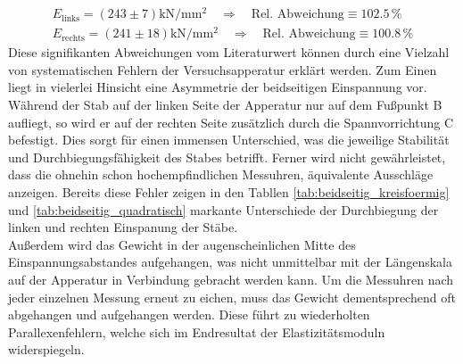 \begin{gather}
\label{eqn:schlechte_Werte_k}
    E_\text{links} =   \left( 243    \pm 7\right)\unit{\kilo \newton \per \milli \meter \squared}\quad \Rightarrow \quad \text{Rel. Abweichung} \equiv 102.5\,\unit{\percent}\\
    E_\text{rechts} =  \left( 241    \pm 18\right)\unit{\kilo \newton \per \milli \meter \squared}\quad \Rightarrow \quad \text{Rel. Abweichung} \equiv 100.8\,\unit{\percent}
\end{gather}
\noindent
Diese signifikanten Abweichungen vom Literaturwert können durch eine Vielzahl von systematischen Fehlern der Versuchsapperatur erklärt werden.
Zum Einen liegt in vielerlei Hinsicht eine Asymmetrie der beidseitigen Einspannung vor. Während der Stab auf der linken Seite der Apperatur nur auf dem
Fußpunkt B aufliegt, so wird er auf der rechten Seite zusätzlich durch die Spannvorrichtung C befestigt. Dies sorgt für einen immensen Unterschied,
was die jeweilige Stabilität und Durchbiegungsfähigkeit des Stabes betrifft. Ferner wird nicht gewährleistet, dass die ohnehin schon hochempfindlichen 
Messuhren, äquivalente Ausschläge anzeigen. Bereits diese Fehler zeigen in den Tabllen \ref{tab:beidseitig_kreisfoermig} und \ref{tab:beidseitig_quadratisch}
markante Unterschiede der Durchbiegung der linken und rechten Einspanung der Stäbe.\\
Außerdem wird das Gewicht in der augenscheinlichen Mitte des Einspannungsabstandes aufgehangen, was nicht unmittelbar mit der Längenskala auf der Apperatur
in Verbindung gebracht werden kann. Um die Messuhren nach jeder einzelnen Messung erneut zu eichen, muss das Gewicht dementsprechend oft abgehangen und aufgehangen 
werden. Diese führt zu wiederholten Parallexenfehlern, welche sich im Endresultat der Elastizitätsmoduln widerspiegeln. 

